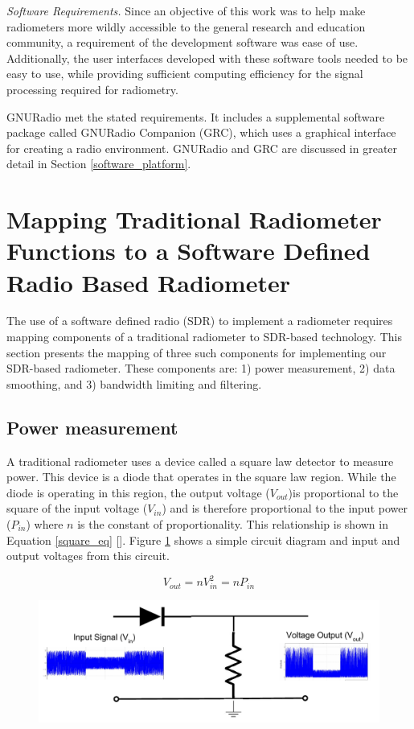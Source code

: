 \emph{Software Requirements.}  Since an objective of this work was to help make radiometers more wildly accessible to the general research and education community, a requirement of the development software was ease of use.  Additionally, the user interfaces developed with these software tools needed to be easy to use, while providing sufficient computing efficiency for the signal processing required for radiometry.

GNURadio met the stated requirements.  It includes a supplemental software package called GNURadio Companion (GRC), which uses a graphical interface for creating a radio environment.  GNURadio and GRC are discussed in greater detail in Section \ref{software_platform}.

\section{Mapping Traditional Radiometer Functions to a Software Defined Radio Based Radiometer}

The use of a software defined radio (SDR) to implement a radiometer requires mapping components of a traditional radiometer to SDR-based technology.  This section presents the mapping of three such components for implementing our SDR-based radiometer.  These components are:  1) power measurement, 2) data smoothing, and 3) bandwidth limiting and filtering.

\subsection{Power measurement}

A traditional radiometer uses a device called a square law detector to measure power.  This device is a diode that operates in the square law region.  While the diode is operating in this region, the output voltage ($V_{out}$)is proportional to the square of the input voltage ($V_{in}$) and is therefore proportional to the input power ($P_{in}$) where $n$ is the constant of proportionality.  This relationship is shown in Equation \ref{square_eq} [\cite{Navy_detector}].  Figure \ref{square_law_simple} shows a simple circuit diagram and input and output voltages from this circuit.

\begin{equation}\label{square_eq}
V_{out} = nV_{in}^2 = nP_{in}
\end{equation}

{\begin{figure}[h!tb] 
\centering
\includegraphics[width=17cm]{Images/square_law.pdf}
\label{square_law_simple}
\end{figure}
}

